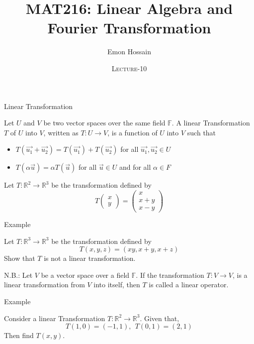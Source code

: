 \documentclass[11pt]{beamer}
\author[] %
{Emon Hossain\inst{1}}
\institute[University of Dhaka] %
{
  \inst{1}%
  Lecturer\\MNS department\\Brac University
}
\date[] %
{\textsc{Lecture-10}}
\title[]{MAT216: Linear Algebra and Fourier Transformation}
\theoremstyle{plain}
\begin{document}
\begin{frame}
\titlepage
\end{frame}

\begin{frame}{Linear Transformation}
    \begin{definition}
        Let $U$ and $V$ be two vector spaces over the same field $\mathbb F$. A linear Transformation $T$ of $U$ into $V$, written as $T: U \rightarrow V$, is a function of $U$ into $V$ such that
        \begin{itemize}
            \item $T\left(\overrightarrow{u_1}+\overrightarrow{u_2}\right)=T\left(\overrightarrow{u_1}\right)+T\left(\overrightarrow{u_2}\right)$ for all $\overrightarrow{u_1}, \overrightarrow{u_2} \in U$ 
            \item $T(\alpha \vec{u})=\alpha T(\vec{u})$ for all $\vec{u} \in U$ and for all $\alpha \in F$
        \end{itemize}
    \end{definition}
    \begin{example}
        Let $T:\mathbb R^2\rightarrow\mathbb R^3$ be the transformation defined by $$T\begin{pmatrix}
            x\\y
        \end{pmatrix}=\begin{pmatrix}
            x\\x+y\\x-y
        \end{pmatrix}$$
    \end{example}
\end{frame}

\begin{frame}{Example}
    \begin{example}
        Let $T:\mathbb R^3\rightarrow\mathbb R^3$ be the transformation defined by $$T(x,y,z)=(xy,x+y,x+z)$$
        Show that $T$ is not a linear transformation.
    \end{example}
    N.B.: Let $V$ be a vector space over a field $\mathbb F$. If the transformation $T:V\rightarrow V$, is a linear transformation from $V$ into itself, then $T$ is called a linear operator.
\end{frame}

\begin{frame}{Example}
    \begin{example}
        Consider a linear Transformation $T:\mathbb R^2\rightarrow\mathbb R^3$. Given that, 
    $$T(1,0)=(-1,1),\:\:T(0,1)=(2,1)$$
    Then find $T(x,y)$.
    \end{example}
\end{frame}
\end{document}
